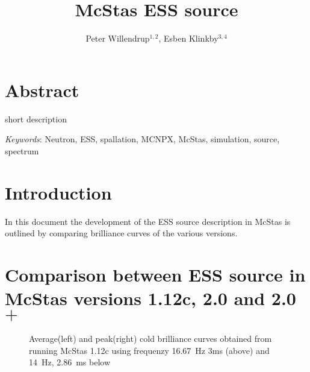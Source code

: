 \documentclass{elsarticle}
\begin{document}
\setpagewiselinenumbers
\begin{frontmatter}
\title{McStas ESS source}
\author{Peter Willendrup$^{1,2}$, Esben Klinkby$^{3,4}$}
\address{1) DTU Physics, Technical University of Denmark, DTU Lyngby Campus, Anker Engelunds Vej 1, DK-2800 Kgs. Lyngby, Denmark}
\address{2) ESS design update programme - Denmark}
\address{3) European Spallation Source ESS AB, Box 176, S-221 00 Lund, Sweden}
\address{4) DTU Nutech, Technical University of Denmark, DTU Ris\o~Campus,\\ Frederiksborgvej 399, DK-4000 Roskilde, Denmark}
\end{frontmatter}
\section{Abstract}
short description




\emph{Keywords}: Neutron, ESS, spallation, MCNPX, McStas, simulation, source, spectrum

\section{Introduction}
In this document the development of the ESS source description in McStas\cite{lefm:1999,will:2013,man,comp} is outlined by comparing brilliance curves of the various versions.

\section{Comparison between ESS source in McStas versions 1.12c, 2.0 and 2.0$+$}
\label{sec:val}

\begin{figure}[h!]
\begin{minipage}{\linewidth}
\centering
{}
\caption{Average(left) and peak(right) cold brilliance curves obtained from running McStas 1.12c using frequenzy 16.67~Hz 3ms (above) and 14~Hz, 2.86~ms below}
\label{fig:2001}
\end{minipage}\hfill
\end{figure}
\end{document}
